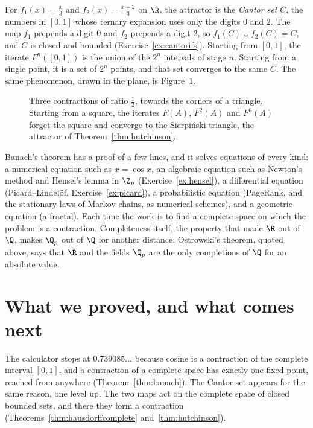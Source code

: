 For $f_1(x)=\frac x3$ and $f_2(x)=\frac{x+2}3$ on $\R$, the attractor is the \emph{Cantor set} $C$, the numbers in $[0,1]$ whose ternary expansion uses only the digits $0$ and $2$. The map $f_1$ prepends a digit $0$ and $f_2$ prepends a digit $2$, so $f_1(C)\cup f_2(C)=C$, and $C$ is closed and bounded (Exercise~\ref{ex:cantorifs}). Starting from $[0,1]$, the iterate $F^n([0,1])$ is the union of the $2^n$ intervals of stage $n$. Starting from a single point, it is a set of $2^n$ points, and that set converges to the same $C$. The same phenomenon, drawn in the plane, is Figure~\ref{fig:sierpinski}.

\begin{figure}[ht]
\centering
{}
\caption{Three contractions of ratio $\frac12$, towards the corners of a triangle. Starting from a square, the iterates $F(A)$, $F^2(A)$ and $F^6(A)$ forget the square and converge to the Sierpi\'nski triangle, the attractor of Theorem~\ref{thm:hutchinson}.}
\label{fig:sierpinski}
\end{figure}

\begin{beauty}
Banach's theorem has a proof of a few lines, and it solves equations of every kind: a numerical equation such as $x=\cos x$, an algebraic equation such as Newton's method and Hensel's lemma in $\Z_p$ (Exercise~\ref{ex:hensel}), a differential equation (Picard--Lindel\"of, Exercise~\ref{ex:picard}), a probabilistic equation (PageRank, and the stationary laws of Markov chains, as numerical schemes), and a geometric equation (a fractal). Each time the work is to find a complete space on which the problem is a contraction. Completeness itself, the property that made $\R$ out of $\Q$, makes $\Q_p$ out of $\Q$ for another distance. Ostrowski's theorem, quoted above, says that $\R$ and the fields $\Q_p$ are the only completions of $\Q$ for an absolute value.
\end{beauty}

\section{What we proved, and what comes next}

The calculator stops at $0.739085\ldots$ because cosine is a contraction of the complete interval $[0,1]$, and a contraction of a complete space has exactly one fixed point, reached from anywhere (Theorem~\ref{thm:banach}). The Cantor set appears for the same reason, one level up. The two maps act on the complete space of closed bounded sets, and there they form a contraction (Theorems~\ref{thm:hausdorffcomplete} and~\ref{thm:hutchinson}).


